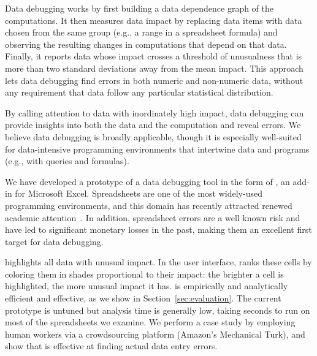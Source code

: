 Data debugging works by first building a data dependence graph of the
computations. It then measures data impact by replacing data items
with data chosen from the same group (e.g., a range in a spreadsheet
formula) and observing the resulting changes in computations that
depend on that data. Finally, it reports data whose impact crosses a threshold of
unusualness that is more than two standard deviations away from the
mean impact. This approach lets data
debugging find errors in both numeric and non-numeric data, without
any requirement that data follow any particular statistical
distribution.

By calling attention to data with inordinately high impact, data debugging can
provide insights into both the data and the computation and reveal
errors. We believe data debugging is broadly applicable, though it is
especially well-suited for data-intensive programming environments that intertwine
data and programs (e.g., with queries and formulas).

We have developed a prototype of a data debugging tool in the form
of \checkcell{}, an add-in for Microsoft Excel. Spreadsheets are one
of the most widely-used programming environments, and this domain has
recently attracted renewed academic
attention~\cite{DBLP:conf/popl/Gulwani11,DBLP:conf/pldi/HarrisG11,Singh:2012:LSS:2212351.2212356}.
In addition, spreadsheet errors are a well known risk and have led to
significant monetary losses in the past, making them an excellent
first target for data debugging.

\checkcell{} highlights all data with unusual impact. In the user interface, \checkcell{} ranks these cells by
coloring them in shades proportional to their impact: the brighter a
cell is highlighted, the more unusual impact it has. \checkcell{} is
empirically and analytically efficient and effective, as we show in
Section~\ref{sec:evaluation}. The current prototype is untuned but
analysis time is generally low, taking seconds to run on most of the
spreadsheets we examine. We
perform a case study by employing human workers via a crowdsourcing
platform (Amazon's Mechanical Turk), and show that \checkcell{} is
effective at finding actual data entry errors.

